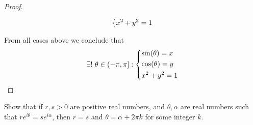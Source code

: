 \begin{proof}
\begin{itemize}
\begin{align*}
\begin{dcases}
                                                          x^2 + y^2 = 1
                                                        \end{dcases}
          \end{align*}
  \end{itemize}
  From all cases above we conclude that
  \[
    \exists!\ \theta \in (-\pi, \pi] : \begin{dcases}
      \sin(\theta) = x \\
      \cos(\theta) = y \\
      x^2 + y^2 = 1
    \end{dcases}
  \]
\end{proof}

\begin{ex}\label{ex:4.7.5}
  Show that if \(r, s > 0\) are positive real numbers, and \(\theta, \alpha\) are real numbers such that \(r e^{i \theta} = s e^{i \alpha}\), then \(r = s\) and \(\theta = \alpha + 2 \pi k\) for some integer \(k\).
\end{ex}

